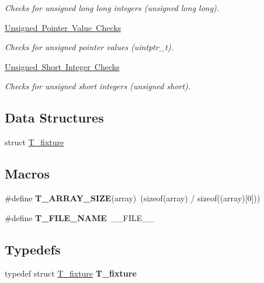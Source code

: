 \begin{DoxyCompactItemize}
\begin{DoxyCompactList}\small\item\em Checks for unsigned long long integers (unsigned long long). \end{DoxyCompactList}\item 
\mbox{\hyperlink{group__RTEMSTestFrameworkChecksUIntptr}{Unsigned Pointer Value Checks}}
\begin{DoxyCompactList}\small\item\em Checks for unsigned pointer values (uintptr\+\_\+t). \end{DoxyCompactList}\item 
\mbox{\hyperlink{group__RTEMSTestFrameworkChecksUShort}{Unsigned Short Integer Checks}}
\begin{DoxyCompactList}\small\item\em Checks for unsigned short integers (unsigned short). \end{DoxyCompactList}\end{DoxyCompactItemize}
\subsection*{Data Structures}
\begin{DoxyCompactItemize}
\item 
struct \mbox{\hyperlink{structT__fixture}{T\+\_\+fixture}}
\end{DoxyCompactItemize}
\subsection*{Macros}
\begin{DoxyCompactItemize}
\item 
\mbox{\label{group__RTEMSTestFramework_ga8a92bc154d72c1aa275269ae7a93e2f0}} 
\#define {\bfseries T\+\_\+\+A\+R\+R\+A\+Y\+\_\+\+S\+I\+ZE}(array)~(sizeof(array) / sizeof((array)\mbox{[}0\mbox{]}))
\item 
\mbox{\label{group__RTEMSTestFramework_ga4082b99542eb265d2c2f9ead4d8774b1}} 
\#define {\bfseries T\+\_\+\+F\+I\+L\+E\+\_\+\+N\+A\+ME}~\+\_\+\+\_\+\+F\+I\+L\+E\+\_\+\+\_\+
\end{DoxyCompactItemize}
\subsection*{Typedefs}
\begin{DoxyCompactItemize}
\item 
\mbox{\label{group__RTEMSTestFramework_ga8cb4b4892c5bf1ab2d6dea368895adc9}} 
typedef struct \mbox{\hyperlink{structT__fixture}{T\+\_\+fixture}} {\bfseries T\+\_\+fixture}
\end{DoxyCompactItemize}
